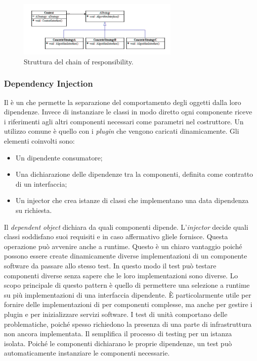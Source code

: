 \begin{figure}[h]
\centering \includegraphics[width=0.7\textwidth]{patterns/strategy.jpg}
\caption{Struttura del chain of responsibility.}
\label{fig:chainofresponsibility}
\end{figure}
	
\subsubsection{Dependency Injection}

Il  è un  che permette la separazione del comportamento degli oggetti dalla loro dipendenze. Invece di instanziare le classi in modo diretto ogni componente riceve i riferimenti agli altri componenti necessari come parametri nel costruttore. Un utilizzo comune è quello con i 	\emph{plugin} che vengono caricati dinamicamente. Gli elementi coinvolti sono:
	
\begin{itemize}
	\item Un dipendente consumatore;
	\item Una dichiarazione delle dipendenze tra la componenti, definita come contratto di un interfaccia;
	\item Un injector che crea istanze di classi che implementano una data dipendenza su richiesta.

\end{itemize}

Il \textit{dependent object} dichiara da quali componenti dipende. L'\textit{injector} decide quali classi soddisfano suoi requisiti e in caso affermativo gliele fornisce. Questa operazione può avvenire anche a runtime. Questo è un chiaro vantaggio poiché possono essere create dinamicamente diverse implementazioni di un componente software da passare allo stesso test. In questo modo il test può testare componenti diverse senza sapere che le loro implementazioni sono diverse.
Lo scopo principale di questo pattern è quello di permettere una selezione a runtime su più implementazioni di una interfaccia dipendente. È particolarmente utile per fornire delle implementazioni di  per componenti complesse, ma anche per gestire i plugin e per inizializzare servizi software. I test di unità comportano delle problematiche, poiché spesso richiedono la presenza di una parte di infrastruttura non ancora implementata. Il  semplifica il processo di testing per un istanza isolata. Poiché le componenti dichiarano le proprie dipendenze, un test può automaticamente instanziare le componenti necessarie.
	 
